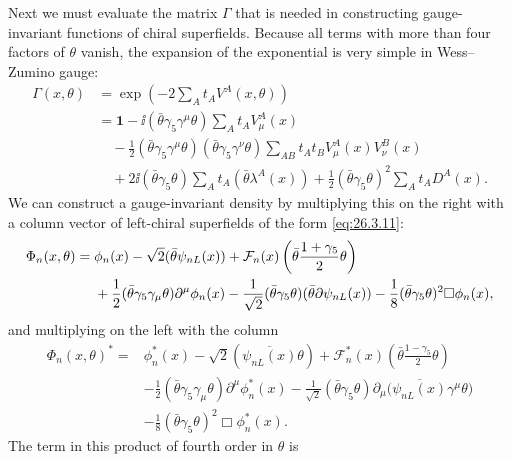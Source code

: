Next we must evaluate the matrix \(\Gamma\) that is needed in constructing
gauge-invariant functions of chiral superfields. Because all terms with more
than four factors of \(\theta\) vanish, the expansion of the exponential is
very simple in Wess--Zumino gauge:
\[
  \begin{aligned}
  \Gamma(x,\theta)
  &=\exp\left(-2\sum_A t_AV^A(x,\theta)\right)
  \\
  &=\mathbf{1}
  -\ii(\bar\theta\gamma_5\gamma^\mu\theta)
    \sum_A t_AV^A_\mu(x)
  \\
  &\quad-\frac12(\bar\theta\gamma_5\gamma^\mu\theta)
    (\bar\theta\gamma_5\gamma^\nu\theta)
    \sum_{AB}t_At_BV^A_\mu(x)V^B_\nu(x)
  \\
  &\quad+2\ii(\bar\theta\gamma_5\theta)
    \sum_A t_A(\bar\theta\lambda^A(x))
  +\frac12(\bar\theta\gamma_5\theta)^2
    \sum_A t_AD^A(x).
  \end{aligned}
\]
We can construct a gauge-invariant density by multiplying this on the right
with a column vector of left-chiral superfields of the form
\eqref{eq:26.3.11}:
\[
  \begin{aligned}
  \Phi_n(x,\theta)={}&
  \phi_n(x)-\sqrt{2}(\bar\theta\psi_{nL}(x))
  +\mathcal{F}_n(x)\left(
    \bar\theta\frac{1+\gamma_5}{2}\theta
  \right)
  \\
  &+\frac12(\bar\theta\gamma_5\gamma_\mu\theta)
    \partial^\mu\phi_n(x)
  -\frac1{\sqrt{2}}(\bar\theta\gamma_5\theta)
    (\bar\theta\sl{\partial}\psi_{nL}(x))
  -\frac18(\bar\theta\gamma_5\theta)^2\Box\phi_n(x),
  \end{aligned}
\]
and multiplying on the left with the column
\[
  \begin{aligned}
  \Phi_n(x,\theta)^*={}&
  \phi_n^*(x)-\sqrt{2}(\overline{\psi_{nL}(x)}\theta)
  +\mathcal{F}_n^*(x)\left(
    \bar\theta\frac{1-\gamma_5}{2}\theta
  \right)
  \\
  &-\frac12(\bar\theta\gamma_5\gamma_\mu\theta)
    \partial^\mu\phi_n^*(x)
  -\frac1{\sqrt{2}}(\bar\theta\gamma_5\theta)
    \partial_\mu\bigl(\overline{\psi_{nL}(x)}\gamma^\mu\theta\bigr)
  \\
  &-\frac18(\bar\theta\gamma_5\theta)^2\Box\phi_n^*(x).
  \end{aligned}
\]
The term in this product of fourth order in \(\theta\) is
